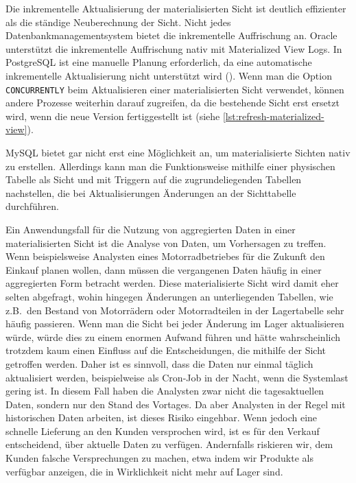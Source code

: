 Die inkrementelle Aktualisierung der materialisierten Sicht ist deutlich effizienter als die ständige Neuberechnung der Sicht.
Nicht jedes Datenbankmanagementsystem bietet die inkrementelle Auffrischung an.
Oracle unterstützt die inkrementelle Auffrischung nativ mit Materialized View Logs.
In PostgreSQL ist eine manuelle Planung erforderlich, da eine automatische inkrementelle Aktualisierung nicht unterstützt wird (\cite{mat_view_features_per_db}).
Wenn man die Option \texttt{CONCURRENTLY} beim Aktualisieren einer materialisierten Sicht verwendet, können andere Prozesse weiterhin darauf zugreifen, da die bestehende Sicht erst ersetzt wird, wenn die neue Version fertiggestellt ist (siehe \ref{lst:refresh-materialized-view}).

MySQL bietet gar nicht erst eine Möglichkeit an, um materialisierte Sichten nativ zu erstellen.
Allerdings kann man die Funktionsweise mithilfe einer physischen Tabelle als Sicht und mit Triggern auf die zugrundeliegenden Tabellen nachstellen, die bei Aktualisierungen Änderungen an der Sichttabelle durchführen.

Ein Anwendungsfall für die Nutzung von aggregierten Daten in einer materialisierten Sicht ist die Analyse von Daten, um Vorhersagen zu treffen.
Wenn beispielsweise Analysten eines Motorradbetriebes für die Zukunft den Einkauf planen wollen, dann müssen die vergangenen Daten häufig in einer aggregierten Form betracht werden.
Diese materialisierte Sicht wird damit eher selten abgefragt, wohin hingegen Änderungen an unterliegenden Tabellen, wie z.B.\ den Bestand von Motorrädern oder Motorradteilen in der Lagertabelle sehr häufig passieren.
Wenn man die Sicht bei jeder Änderung im Lager aktualisieren würde, würde dies zu einem enormen Aufwand führen und hätte wahrscheinlich trotzdem kaum einen Einfluss auf die Entscheidungen, die mithilfe der Sicht getroffen werden.
Daher ist es sinnvoll, dass die Daten nur einmal täglich aktualisiert werden, beispielweise als Cron-Job in der Nacht, wenn die Systemlast gering ist.
In diesem Fall haben die Analysten zwar nicht die tagesaktuellen Daten, sondern nur den Stand des Vortages.
Da aber Analysten in der Regel mit historischen Daten arbeiten, ist dieses Risiko eingehbar.
Wenn jedoch eine schnelle Lieferung an den Kunden versprochen wird, ist es für den Verkauf entscheidend, über aktuelle Daten zu verfügen.
Andernfalls riskieren wir, dem Kunden falsche Versprechungen zu machen, etwa indem wir Produkte als verfügbar anzeigen, die in Wirklichkeit nicht mehr auf Lager sind.

